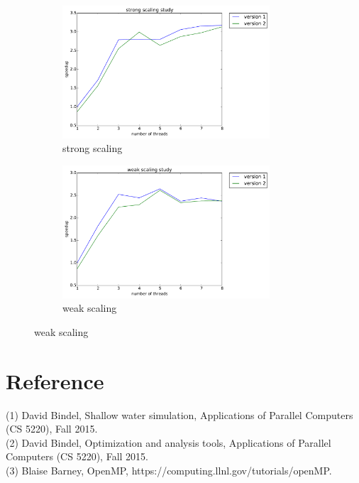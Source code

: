 \documentclass[12pt]{article}
\numberwithin{equation}{section}
\begin{document}
\begin{figure}[!ht]
   \begin{subfigure}
      \centering
        \begin{center}
      \includegraphics[width=0.85\textwidth] {timing_strong}
        \end{center}
      \label{aload0}
      \caption{strong scaling}
  \end{subfigure}
  \begin{subfigure}
      \centering
        \begin{center}
      \includegraphics[width=0.85\textwidth] {timing_weak}
        \end{center}
      \label{aload1}
      \caption{weak scaling}
  \end{subfigure}

\end{figure}






\section*{Reference}

(1) David Bindel, Shallow water simulation, Applications of Parallel Computers (CS 5220), Fall 2015.
\\
(2) David Bindel, Optimization and analysis tools, Applications of Parallel Computers (CS 5220), Fall 2015.
\\
(3) Blaise Barney, OpenMP, https://computing.llnl.gov/tutorials/openMP.
\end{document}
